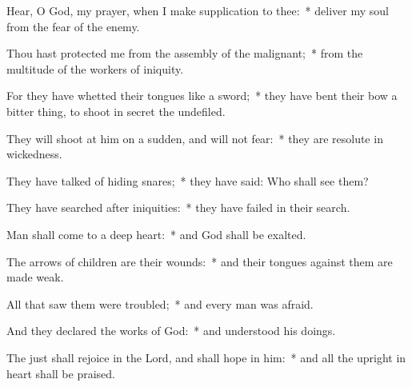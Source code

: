 \begin{enpars}
\item Hear, O God, my prayer, when I make supplication to thee:~* deliver my soul from the fear of the enemy.
\item Thou hast protected me from the assembly of the malignant;~* from the multitude of the workers of iniquity.
\item For they have whetted their tongues like a sword;~* they have bent their bow a bitter thing, to shoot in secret the undefiled.
\item They will shoot at him on a sudden, and will not fear:~* they are resolute in wickedness.
\item They have talked of hiding snares;~* they have said: Who shall see them?
\item They have searched after iniquities:~* they have failed in their search.
\item Man shall come to a deep heart:~* and God shall be exalted.
\item The arrows of children are their wounds:~* and their tongues against them are made weak.
\item All that saw them were troubled;~* and every man was afraid.
\item And they declared the works of God:~* and understood his doings.
\item The just shall rejoice in the Lord, and shall hope in him:~* and all the upright in heart shall be praised.
\end{enpars}